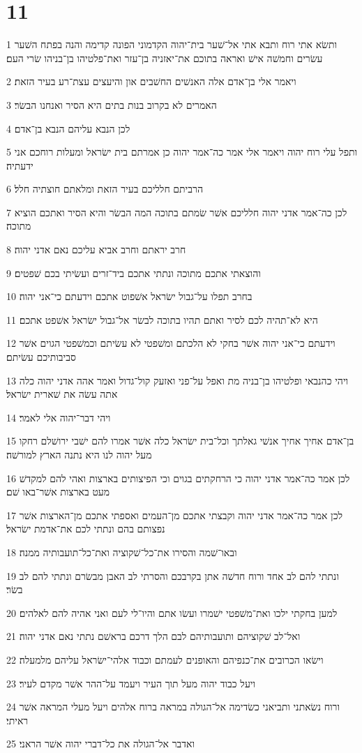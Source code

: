 \chapter{11}

\par 1 ותשׂא אתי רוח ותבא אתי אל־שׁער בית־יהוה הקדמוני הפונה קדימה והנה בפתח השׁער עשׂרים וחמשׁה אישׁ ואראה בתוכם את־יאזניה בן־עזר ואת־פלטיהו בן־בניהו שׂרי העם׃
\par 2 ויאמר אלי בן־אדם אלה האנשׁים החשׁבים און והיעצים עצת־רע בעיר הזאת׃
\par 3 האמרים לא בקרוב בנות בתים היא הסיר ואנחנו הבשׂר׃
\par 4 לכן הנבא עליהם הנבא בן־אדם׃
\par 5 ותפל עלי רוח יהוה ויאמר אלי אמר כה־אמר יהוה כן אמרתם בית ישׂראל ומעלות רוחכם אני ידעתיה׃
\par 6 הרביתם חלליכם בעיר הזאת ומלאתם חוצתיה חלל׃
\par 7 לכן כה־אמר אדני יהוה חלליכם אשׁר שׂמתם בתוכה המה הבשׂר והיא הסיר ואתכם הוציא מתוכה׃
\par 8 חרב יראתם וחרב אביא עליכם נאם אדני יהוה׃
\par 9 והוצאתי אתכם מתוכה ונתתי אתכם ביד־זרים ועשׂיתי בכם שׁפטים׃
\par 10 בחרב תפלו על־גבול ישׂראל אשׁפוט אתכם וידעתם כי־אני יהוה׃
\par 11 היא לא־תהיה לכם לסיר ואתם תהיו בתוכה לבשׂר אל־גבול ישׂראל אשׁפט אתכם׃
\par 12 וידעתם כי־אני יהוה אשׁר בחקי לא הלכתם ומשׁפטי לא עשׂיתם וכמשׁפטי הגוים אשׁר סביבותיכם עשׂיתם׃
\par 13 ויהי כהנבאי ופלטיהו בן־בניה מת ואפל על־פני ואזעק קול־גדול ואמר אהה אדני יהוה כלה אתה עשׂה את שׁארית ישׂראל׃
\par 14 ויהי דבר־יהוה אלי לאמר׃
\par 15 בן־אדם אחיך אחיך אנשׁי גאלתך וכל־בית ישׂראל כלה אשׁר אמרו להם ישׁבי ירושׁלם רחקו מעל יהוה לנו היא נתנה הארץ למורשׁה׃
\par 16 לכן אמר כה־אמר אדני יהוה כי הרחקתים בגוים וכי הפיצותים בארצות ואהי להם למקדשׁ מעט בארצות אשׁר־באו שׁם׃
\par 17 לכן אמר כה־אמר אדני יהוה וקבצתי אתכם מן־העמים ואספתי אתכם מן־הארצות אשׁר נפצותם בהם ונתתי לכם את־אדמת ישׂראל׃
\par 18 ובאו־שׁמה והסירו את־כל־שׁקוציה ואת־כל־תועבותיה ממנה׃
\par 19 ונתתי להם לב אחד ורוח חדשׁה אתן בקרבכם והסרתי לב האבן מבשׂרם ונתתי להם לב בשׂר׃
\par 20 למען בחקתי ילכו ואת־משׁפטי ישׁמרו ועשׂו אתם והיו־לי לעם ואני אהיה להם לאלהים׃
\par 21 ואל־לב שׁקוציהם ותועבותיהם לבם הלך דרכם בראשׁם נתתי נאם אדני יהוה׃
\par 22 וישׂאו הכרובים את־כנפיהם והאופנים לעמתם וכבוד אלהי־ישׂראל עליהם מלמעלה׃
\par 23 ויעל כבוד יהוה מעל תוך העיר ויעמד על־ההר אשׁר מקדם לעיר׃
\par 24 ורוח נשׂאתני ותביאני כשׂדימה אל־הגולה במראה ברוח אלהים ויעל מעלי המראה אשׁר ראיתי׃
\par 25 ואדבר אל־הגולה את כל־דברי יהוה אשׁר הראני׃

